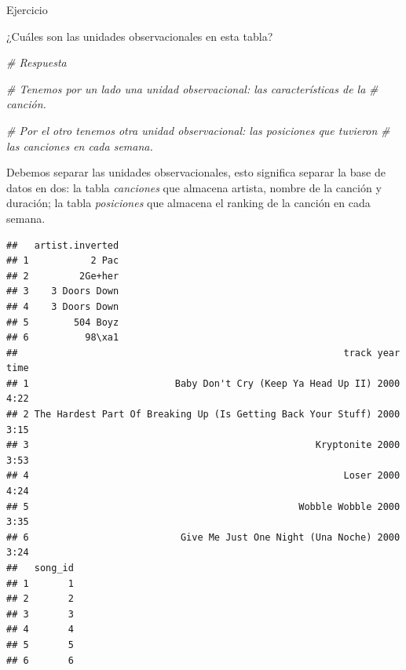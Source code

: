 \documentclass[]{article}
\newenvironment{Shaded}{\begin{snugshade}}{\end{snugshade}}
\newcommand{\KeywordTok}[1]{\textcolor[rgb]{0.13,0.29,0.53}{\textbf{#1}}}
\newcommand{\DataTypeTok}[1]{\textcolor[rgb]{0.13,0.29,0.53}{#1}}
\newcommand{\StringTok}[1]{\textcolor[rgb]{0.31,0.60,0.02}{#1}}
\newcommand{\CommentTok}[1]{\textcolor[rgb]{0.56,0.35,0.01}{\textit{#1}}}
\newcommand{\OperatorTok}[1]{\textcolor[rgb]{0.81,0.36,0.00}{\textbf{#1}}}
\newcommand{\NormalTok}[1]{#1}
\begin{document}
\begin{bclogo}[
  couleur=llred,
  arrondi=0,
  logo=\bcstop,
  barre=none,
  noborder=true]{Ejercicio}
  
¿Cuáles son las unidades observacionales en esta tabla?
\end{bclogo}

\begin{Shaded}
\begin{Highlighting}[]
\CommentTok{# Respuesta}

\CommentTok{# Tenemos por un lado una unidad observacional: las características de la}
\CommentTok{# canción.}

\CommentTok{# Por el otro tenemos otra unidad observacional: las posiciones que tuvieron }
\CommentTok{# las canciones en cada semana.}
\end{Highlighting}
\end{Shaded}

Debemos separar las unidades observacionales, esto significa separar la
base de datos en dos: la tabla \emph{canciones} que almacena artista,
nombre de la canción y duración; la tabla \emph{posiciones} que almacena
el ranking de la canción en cada semana.

\begin{Shaded}
\end{Shaded}

\begin{verbatim}
##   artist.inverted
## 1           2 Pac
## 2         2Ge+her
## 3    3 Doors Down
## 4    3 Doors Down
## 5        504 Boyz
## 6          98\xa1
##                                                          track year time
## 1                          Baby Don't Cry (Keep Ya Head Up II) 2000 4:22
## 2 The Hardest Part Of Breaking Up (Is Getting Back Your Stuff) 2000 3:15
## 3                                                   Kryptonite 2000 3:53
## 4                                                        Loser 2000 4:24
## 5                                                Wobble Wobble 2000 3:35
## 6                           Give Me Just One Night (Una Noche) 2000 3:24
##   song_id
## 1       1
## 2       2
## 3       3
## 4       4
## 5       5
## 6       6
\end{verbatim}
\end{document}
